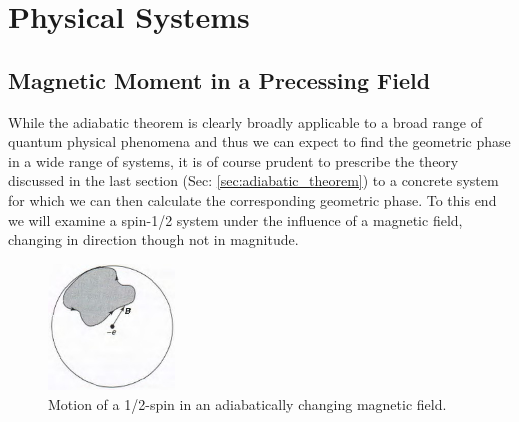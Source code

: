 \documentclass{article}
\begin{document}
\section{Physical Systems}\label{sec:physical_systems}
\subsection{Magnetic Moment in a Precessing Field}\label{ssec:magenetic_moment}

While the adiabatic theorem is clearly broadly applicable to a broad range of quantum physical phenomena and thus we can expect to find the geometric phase in a wide range of systems, it is of course prudent to prescribe the theory discussed in the last section (Sec: \ref{sec:adiabatic_theorem}) to a concrete system for which we can then calculate the corresponding geometric phase. To this end we will examine a spin-1/2 system under the influence of a magnetic field, changing in direction though not in magnitude.
  
  \begin{figure}
    \label{fig:spin_system}
    \includegraphics[width=0.3\textwidth]{b_spin_system_2}
    \caption{Motion of a 1/2-spin in an adiabatically changing magnetic field.}
  \end{figure}
\end{document}
